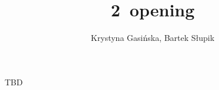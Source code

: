 \documentclass[12pt, a4paper]{article}
\title{2\ntx\ opening}
\author{Krystyna Gasińska, Bartek Słupik}
\begin{document}
\maketitle


TBD

\end{document}
